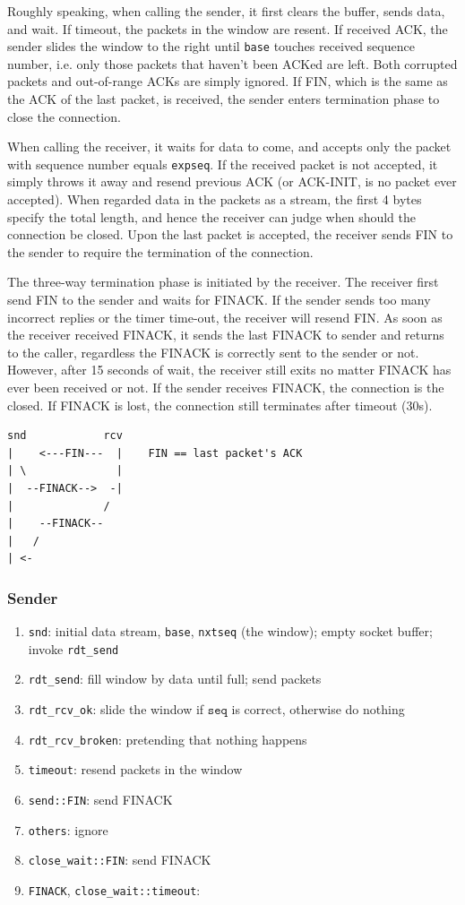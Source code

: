 \documentclass[10pt,a4paper]{article}
\begin{document}
    Roughly speaking, when calling the sender, it first clears the buffer, sends data, and wait. If timeout, the packets in the window are resent. If received ACK, the sender slides the window to the right until \texttt{base} touches received sequence number, i.e. only those packets that haven't been ACKed are left. Both corrupted packets and out-of-range ACKs are simply ignored. If FIN, which is the same as the ACK of the last packet, is received, the sender enters termination phase to close the connection.

    When calling the receiver, it waits for data to come, and accepts only the packet with sequence number equals \texttt{expseq}. If the received packet is not accepted, it simply throws it away and resend previous ACK (or ACK-INIT, is no packet ever accepted). When regarded data in the packets as a stream, the first 4 bytes specify the total length, and hence the receiver can judge when should the connection be closed. Upon the last packet is accepted, the receiver sends FIN to the sender to require the termination of the connection.

    The three-way termination phase is initiated by the receiver. The receiver first send FIN to the sender and waits for FINACK. If the sender sends too many incorrect replies or the timer time-out, the receiver will resend FIN. As soon as the receiver received FINACK, it sends the last FINACK to sender and returns to the caller, regardless the FINACK is correctly sent to the sender or not. However, after 15 seconds of wait, the receiver still exits no matter FINACK  has ever been received or not. If the sender receives FINACK, the connection is the closed. If FINACK is lost, the connection still terminates after timeout (30s).
\begin{verbatim}
snd            rcv
|    <---FIN---  |    FIN == last packet's ACK
| \              |
|  --FINACK-->  -|
|              /
|    --FINACK--
|   /
| <-
\end{verbatim}
    \subsubsection{Sender}
    \begin{enumerate}
    	\item \texttt{snd}: initial data stream, \texttt{base}, \texttt{nxtseq} (the window); empty socket buffer; invoke \texttt{rdt\_send}
        \item \texttt{rdt\_send}: fill window by data until full; send packets
        \item \texttt{rdt\_rcv\_ok}: slide the window if $\texttt{seq}$ is correct, otherwise do nothing
        \item \texttt{rdt\_rcv\_broken}: pretending that nothing happens
        \item \texttt{timeout}: resend packets in the window
        \item \texttt{send::FIN}: send FINACK
        \item \texttt{others}: ignore
        \item \texttt{close\_wait::FIN}: send FINACK
        \item \texttt{FINACK}, \texttt{close\_wait::timeout}:
    \end{enumerate}
\end{document}
